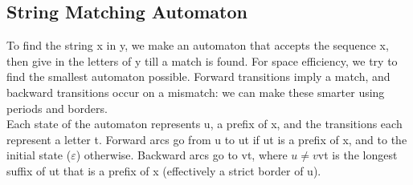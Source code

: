 \subsection{String Matching Automaton}
To find the string x in y, we make an automaton that accepts the sequence x, then give in the letters of y till a match is found. For space efficiency, we try to find the smallest automaton possible. Forward transitions imply a match, and backward transitions occur on a mismatch: we can make these smarter using periods and borders. \\

Each state of the automaton represents u, a prefix of x, and the transitions each represent a letter t. Forward arcs go from u to ut if ut is a prefix of x, and to the initial state ($\varepsilon$) otherwise. Backward arcs go to vt, where $u\neq v$vt is the longest suffix of ut that is a prefix of x (effectively a strict border of u).
